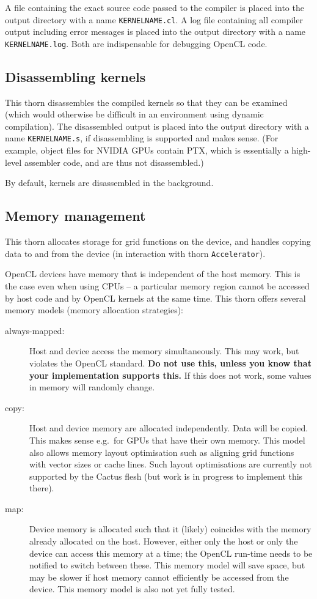 A file containing the exact source code passed to the compiler is
placed into the output directory with a name \texttt{KERNELNAME.cl}. A
log file containing all compiler output including error messages is
placed into the output directory with a name \texttt{KERNELNAME.log}.
Both are indispensable for debugging OpenCL code.

\subsection{Disassembling kernels}

This thorn disassembles the compiled kernels so that they can be
examined (which would otherwise be difficult in an environment using
dynamic compilation). The disassembled output is placed into the
output directory with a name \texttt{KERNELNAME.s}, if disassembling
is supported and makes sense. (For example, object files for NVIDIA
GPUs contain PTX, which is essentially a high-level assembler code,
and are thus not disassembled.)

By default, kernels are disassembled in the background.

\subsection{Memory management}

This thorn allocates storage for grid functions on the device, and
handles copying data to and from the device (in interaction with thorn
\texttt{Accelerator}).

OpenCL devices have memory that is independent of the host memory.
This is the case even when using CPUs -- a particular memory region
cannot be accessed by host code and by OpenCL kernels at the same
time. This thorn offers several memory models (memory allocation
strategies):
\begin{description}
\item[always-mapped:] Host and device access the memory
  simultaneously. This may work, but violates the OpenCL standard.
  \textbf{Do not use this, unless you know that your implementation
    supports this.} If this does not work, some values in memory will
  randomly change.
\item[copy:] Host and device memory are allocated independently. Data
  will be copied. This makes sense e.g.\ for GPUs that have their own
  memory. This model also allows memory layout optimisation such as
  aligning grid functions with vector sizes or cache lines. Such
  layout optimisations are currently not supported by the Cactus flesh
  (but work is in progress to implement this there).
\item[map:] Device memory is allocated such that it (likely) coincides
  with the memory already allocated on the host. However, either only
  the host or only the device can access this memory at a time; the
  OpenCL run-time needs to be notified to switch between these. This
  memory model will save space, but may be slower if host memory
  cannot efficiently be accessed from the device. This memory model is
  also not yet fully tested.
\end{description}


